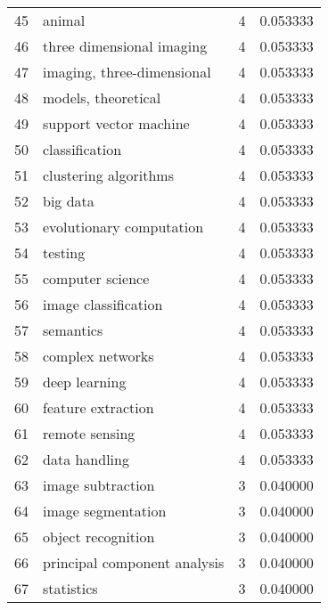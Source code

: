 \begin{tabular}{llrr}
45 &                                   animal &           4 &    0.053333 \\
46 &                three dimensional imaging &           4 &    0.053333 \\
47 &               imaging, three-dimensional &           4 &    0.053333 \\
48 &                      models, theoretical &           4 &    0.053333 \\
49 &                   support vector machine &           4 &    0.053333 \\
50 &                           classification &           4 &    0.053333 \\
51 &                    clustering algorithms &           4 &    0.053333 \\
52 &                                 big data &           4 &    0.053333 \\
53 &                 evolutionary computation &           4 &    0.053333 \\
54 &                                  testing &           4 &    0.053333 \\
55 &                         computer science &           4 &    0.053333 \\
56 &                     image classification &           4 &    0.053333 \\
57 &                                semantics &           4 &    0.053333 \\
58 &                         complex networks &           4 &    0.053333 \\
59 &                            deep learning &           4 &    0.053333 \\
60 &                       feature extraction &           4 &    0.053333 \\
61 &                           remote sensing &           4 &    0.053333 \\
62 &                            data handling &           4 &    0.053333 \\
63 &                        image subtraction &           3 &    0.040000 \\
64 &                       image segmentation &           3 &    0.040000 \\
65 &                       object recognition &           3 &    0.040000 \\
66 &             principal component analysis &           3 &    0.040000 \\
67 &                               statistics &           3 &    0.040000 \\

\end{tabular}

